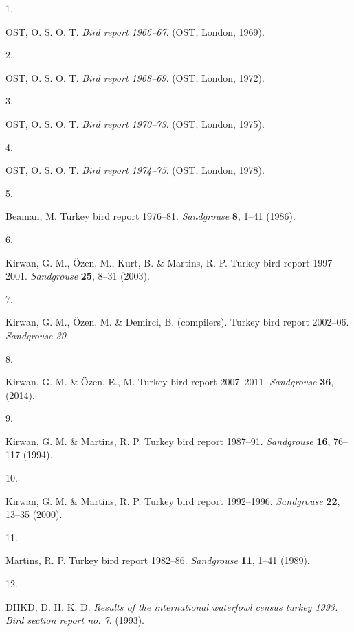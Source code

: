 \documentclass[
  letterpaper,
  DIV=11,
  numbers=noendperiod]{scrreprt}
\newlength{\cslhangindent}
\newlength{\csllabelwidth}
\newlength{\cslentryspacingunit} %
\newenvironment{CSLReferences}[2] %
 {%
  \setlength{\parindent}{0pt}
  \ifodd #1
  \let\oldpar\par
  \def\par{\hangindent=\cslhangindent\oldpar}
  \fi
  \setlength{\parskip}{#2\cslentryspacingunit}
 }%
 {}
\newcommand{\CSLLeftMargin}[1]{\parbox[t]{\csllabelwidth}{#1}}
\newcommand{\CSLRightInline}[1]{\parbox[t]{\linewidth - \csllabelwidth}{#1}\break}
\begin{document}
\hypertarget{refs}{}
\begin{CSLReferences}{0}{0}
\leavevmode{}%
\CSLLeftMargin{1. }%
\CSLRightInline{OST, O. S. O. T. \emph{Bird report 1966--67}. (OST,
London, 1969).}

\leavevmode{}%
\CSLLeftMargin{2. }%
\CSLRightInline{OST, O. S. O. T. \emph{Bird report 1968--69}. (OST,
London, 1972).}

\leavevmode{}%
\CSLLeftMargin{3. }%
\CSLRightInline{OST, O. S. O. T. \emph{Bird report 1970--73}. (OST,
London, 1975).}

\leavevmode{}%
\CSLLeftMargin{4. }%
\CSLRightInline{OST, O. S. O. T. \emph{Bird report 1974--75}. (OST,
London, 1978).}

\leavevmode{}%
\CSLLeftMargin{5. }%
\CSLRightInline{Beaman, M. Turkey bird report 1976--81.
\emph{Sandgrouse} \textbf{8}, 1--41 (1986).}

\leavevmode{}%
\CSLLeftMargin{6. }%
\CSLRightInline{Kirwan, G. M., Özen, M., Kurt, B. \& Martins, R. P.
Turkey bird report 1997--2001. \emph{Sandgrouse} \textbf{25}, 8--31
(2003).}

\leavevmode{}%
\CSLLeftMargin{7. }%
\CSLRightInline{Kirwan, G. M., Özen, M. \& Demirci, B. (compilers).
Turkey bird report 2002--06. \emph{Sandgrouse 30}.}

\leavevmode{}%
\CSLLeftMargin{8. }%
\CSLRightInline{Kirwan, G. M. \& Özen, E., M. Turkey bird report
2007--2011. \emph{Sandgrouse} \textbf{36}, (2014).}

\leavevmode{}%
\CSLLeftMargin{9. }%
\CSLRightInline{Kirwan, G. M. \& Martins, R. P. Turkey bird report
1987--91. \emph{Sandgrouse} \textbf{16}, 76--117 (1994).}

\leavevmode{}%
\CSLLeftMargin{10. }%
\CSLRightInline{Kirwan, G. M. \& Martins, R. P. Turkey bird report
1992--1996. \emph{Sandgrouse} \textbf{22}, 13--35 (2000).}

\leavevmode{}%
\CSLLeftMargin{11. }%
\CSLRightInline{Martins, R. P. Turkey bird report 1982--86.
\emph{Sandgrouse} \textbf{11}, 1--41 (1989).}

\leavevmode{}%
\CSLLeftMargin{12. }%
\CSLRightInline{DHKD, D. H. K. D. \emph{Results of the international
waterfowl census turkey 1993. Bird section report no. 7}. (1993).}


\end{CSLReferences}
\end{document}
